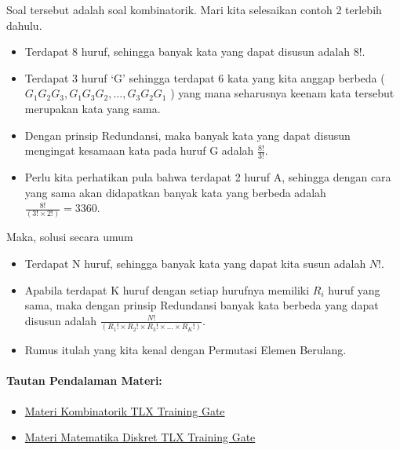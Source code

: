 \documentclass[]{article}
\providecommand{\tightlist}{%
  \setlength{\itemsep}{0pt}\setlength{\parskip}{0pt}}
\let\oldparagraph\paragraph
\renewcommand{\paragraph}[1]{\oldparagraph{#1}\mbox{}}
\begin{document}
Soal tersebut adalah soal kombinatorik. Mari kita selesaikan contoh 2
terlebih dahulu.

\begin{itemize}
\tightlist
\item
  Terdapat 8 huruf, sehingga banyak kata yang dapat disusun adalah
  \(8!\).
\item
  Terdapat 3 huruf `G' sehingga terdapat 6 kata yang kita anggap berbeda
  (
  \(G_{1} G_{2} G_{3} , G_{1} G_{3} G_{2} , \dots , G_{3} G_{2} G_{1} \)
  ) yang mana seharusnya keenam kata tersebut merupakan kata yang sama.
\item
  Dengan prinsip Redundansi, maka banyak kata yang dapat disusun
  mengingat kesamaan kata pada huruf G adalah \(\frac{8!}{3!}\).
\item
  Perlu kita perhatikan pula bahwa terdapat 2 huruf A, sehingga dengan
  cara yang sama akan didapatkan banyak kata yang berbeda adalah
  \(\frac{8!}{(3! \times 2!)} = 3360\).
\end{itemize}

Maka, solusi secara umum

\begin{itemize}
\tightlist
\item
  Terdapat N huruf, sehingga banyak kata yang dapat kita susun adalah
  \(N!\).
\item
  Apabila terdapat K huruf dengan setiap hurufnya memiliki \(R_{i}\)
  huruf yang sama, maka dengan prinsip Redundansi banyak kata berbeda
  yang dapat disusun adalah
  \(\frac{N!}{(R_{1}! \times R_{2}! \times R_{3}! \times … \times R_{K}!)}\).
\item
  Rumus itulah yang kita kenal dengan Permutasi Elemen Berulang.
\end{itemize}

\paragraph{Tautan Pendalaman Materi:}\label{tautan-pendalaman-materi}

\begin{itemize}
\tightlist
\item
  \href{https://training.ia-toki.org/training/curriculums/1/courses/11/chapters/51/lessons/18/}{Materi
  Kombinatorik TLX Training Gate}
\item
  \href{https://training.ia-toki.org/training/curriculums/1/courses/11/chapters/51/lessons/17/}{Materi
  Matematika Diskret TLX Training Gate}
\end{itemize}
\end{document}
